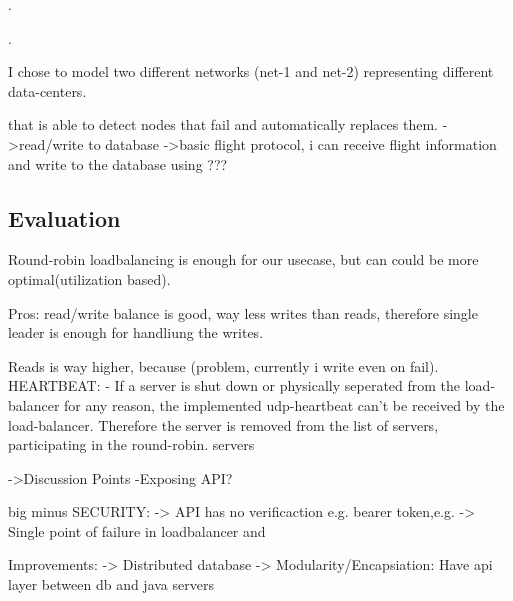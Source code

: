 \documentclass{article}
\begin{document}
.


.












I chose to model two different networks (net-1 and net-2) representing different data-centers. 

that is able to detect nodes that fail and automatically replaces them.
->read/write to database 
->basic flight protocol, i can receive flight information and write to the database using ???

\subsection{Evaluation}
Round-robin loadbalancing is enough for our usecase, but can could be more optimal(utilization based).

Pros:
read/write balance is good, way less writes than reads, therefore single leader is enough for handliung the writes.

Reads is way higher, because (problem, currently i write even on fail). 
HEARTBEAT:
- If a server is shut down or physically seperated from the load-balancer for any reason, the implemented udp-heartbeat can't be received by the load-balancer. Therefore the server is removed from the list of servers, participating in the round-robin.
servers



->Discussion Points
-Exposing API?

big minus SECURITY:
-> API has no verificaction e.g. bearer token,e.g.
-> Single point of failure in loadbalancer and 

Improvements:
-> Distributed database 
-> Modularity/Encapsiation: Have api layer between db and java servers

\printbibliography[heading=bibintoc]
\end{document}
